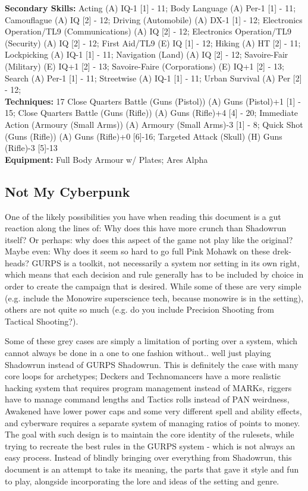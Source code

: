 \begin{multicols}{2}
	\textbf{Secondary Skills: }
	Acting (A) IQ-1 [1] - 11; Body Language (A) Per-1 [1] - 11;  Camouflague (A) IQ [2] - 12; Driving (Automobile) (A) DX-1 [1] - 12; Electronics Operation/TL9 (Communications) (A) IQ [2] - 12; Electronics Operation/TL9 (Security) (A) IQ [2] - 12; First Aid/TL9 (E) IQ [1] - 12; Hiking (A) HT [2] - 11; Lockpicking (A) IQ-1 [1] - 11; Navigation (Land) (A) IQ [2] - 12; Savoire-Fair (Military) (E) IQ+1 [2] - 13; Savoire-Faire (Corporations) (E) IQ+1 [2] - 13; Search (A) Per-1 [1] - 11; Streetwise (A) IQ-1 [1] - 11; Urban Survival (A) Per [2] - 12;\\
	
	\textbf{Techniques: } 17
	Close Quarters Battle (Guns (Pistol)) (A) Guns (Pistol)+1 [1] - 15; Close Quarters Battle (Guns (Rifle)) (A) Guns (Rifle)+4 [4] - 20; Immediate Action (Armoury (Small Arms)) (A) Armoury (Small Arms)-3 [1] - 8; Quick Shot (Guns (Rifle)) (A) Guns (Rifle)+0 [6]-16; Targeted Attack (Skull) (H) Guns (Rifle)-3 [5]-13\\
	
	\textbf{Equipment: }
	Full Body Armour w/ Plates; Ares Alpha
	
	\subsection{Not My Cyberpunk}
	
	One of the likely possibilities you have when reading this document is a gut reaction along the lines of: Why does this have more crunch than Shadowrun itself? Or perhaps: why does this aspect of the game not play like the original? Maybe even: Why does it seem so hard to go full Pink Mohawk on these drek-heads? GURPS is a toolkit, not necessarily a system nor setting in its own right, which means that each decision and rule generally has to be included by choice in order to create the campaign that is desired. While some of these are very simple (e.g. include the Monowire superscience tech, because monowire is in the setting), others are not quite so much (e.g. do you include Precision Shooting from Tactical Shooting?).
	
	Some of these grey cases are simply a limitation of porting over a system, which cannot always be done in a one to one fashion without.. well just playing Shadowrun instead of GURPS Shadowrun. This is definitely the case with many core loops for archetypes; Deckers and Technomancers have a more realistic hacking system that requires program management instead of MARKs, riggers have to manage command lengths and Tactics rolls instead of PAN weirdness, Awakened have lower power caps and some very different spell and ability effects, and cyberware requires a separate system of managing ratios of points to money. The goal with such design is to maintain the core identity of the rulesets, while trying to recreate the best rules in the GURPS system - which is not always an easy process. Instead of blindly bringing over everything from Shadowrun, this document is an attempt to take its meaning, the parts that gave it style and fun to play, alongside incorporating the lore and ideas of the setting and genre.
	

\end{multicols}

